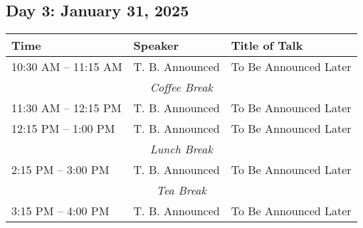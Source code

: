 \subsection*{Day 3: January 31, 2025}

\noindent
\renewcommand{\arraystretch}{1.5} %
\begin{tabular}{|p{3.5cm}|p{4cm}|p{7cm}|}
	\hline
	\textbf{Time} & \textbf{Speaker} & \textbf{Title of Talk} \\
	\hline
	10:30 AM -- 11:15 AM & T. B. Announced & To Be Announced Later \\
	\hline
	\multicolumn{3}{|c|}{\textit{Coffee Break}} \\
	\hline
	11:30 AM -- 12:15 PM & T. B. Announced & To Be Announced Later \\
	\hline
	12:15 PM -- 1:00 PM & T. B. Announced & To Be Announced Later \\
	\hline
	\multicolumn{3}{|c|}{\textit{Lunch Break}} \\
	\hline
	2:15 PM -- 3:00 PM & T. B. Announced & To Be Announced Later \\
	\hline
	\multicolumn{3}{|c|}{\textit{Tea Break}} \\
	\hline
	3:15 PM -- 4:00 PM & T. B. Announced & To Be Announced Later \\
	\hline
\end{tabular}
